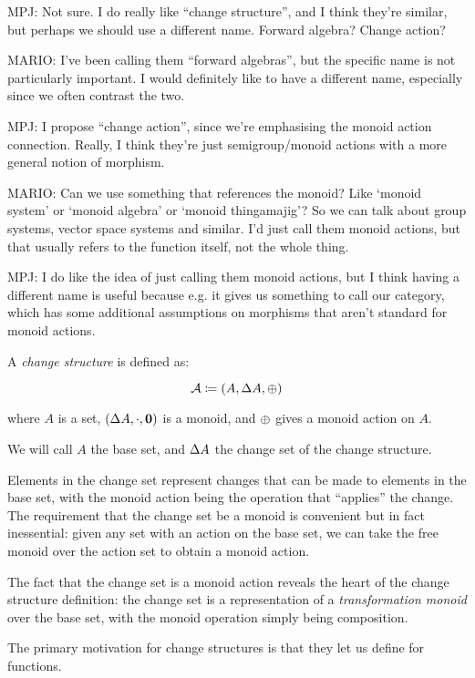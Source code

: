 MPJ: Not sure. I do really like ``change structure'', and I think they're
similar, but perhaps we should use a different name. Forward algebra? Change action?

MARIO: I've been calling them ``forward algebras'', but the specific name is not particularly
important. I would definitely like to have a different name, especially since we often contrast the two.

MPJ: I propose ``change action'', since we're emphasising the monoid action
connection. Really, I think they're just semigroup/monoid actions with a more
general notion of morphism.

MARIO: Can we use something that references the monoid? Like `monoid system' or
`monoid algebra' or `monoid thingamajig'? So we can talk about group systems, vector
space systems and similar.
I'd just call them monoid actions, but that usually refers to the function itself, not
the whole thing.

MPJ: I do like the idea of just calling them monoid actions, but I think having
a different name is useful because e.g. it gives us something to call our
category, which has some additional assumptions on morphisms that aren't
standard for monoid actions.

\begin{defn}
  A \textit{change structure} is defined as:

  $$\mathcal{A} \coloneqq (A,\Delta A,\oplus)$$

  where $A$ is a set, $(\Delta A, \cdot, \textbf{0})$ is a monoid, and $\oplus$ gives a monoid action on $A$.

  We will call $A$ the base set, and $\Delta A$ the change set of the change structure.
\end{defn}

Elements in the change set represent changes that can be made to elements in the
base set, with the monoid action being the operation that ``applies'' the
change. The requirement that the change set be a monoid is convenient but in
fact inessential: given any set with an action on the base set, we can take the
free monoid over the action set to obtain a monoid action.

The fact that the change set is a monoid action reveals the heart of the
change structure definition: the change set is a representation of a
\textit{transformation monoid} over the base set, with the monoid
operation simply being composition.

The primary motivation for change structures is that they let us define
 for functions.

